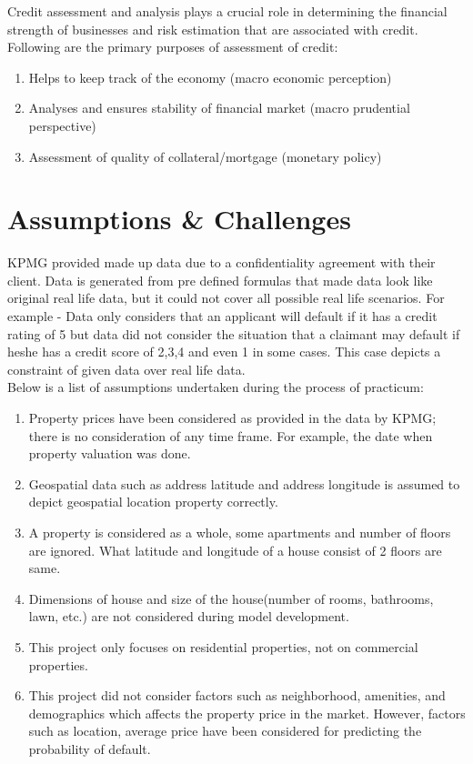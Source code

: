 Credit assessment and analysis plays a crucial role in determining the financial strength of businesses and risk estimation that are associated with credit. Following are the primary purposes of assessment of credit:
\begin{enumerate}
\item Helps to keep track of the economy (macro economic perception) 
\item Analyses and ensures stability of financial market (macro prudential perspective)
\item Assessment of quality of collateral/mortgage (monetary policy)
\end{enumerate}

\section{Assumptions \& Challenges}

KPMG provided made up data due to a confidentiality agreement with their client. Data is generated from pre defined formulas that made data look like original real life data, but it could not cover all possible real life scenarios. For example - Data only considers that an applicant will default if it has a credit rating of 5 but data did not consider the situation that a claimant may default if he\/she has a credit score of 2,3,4 and even 1 in some cases. This case depicts a constraint of given data over real life data.\\

Below is a list of assumptions undertaken during the process of practicum:
\begin{enumerate}
\item Property prices have been considered as provided in the data by KPMG; there is no consideration of any time frame. For example, the date when property valuation was done. 
\item Geospatial data such as address latitude and address longitude is assumed to depict geospatial location property correctly.
\item A property is considered as a whole, some apartments and number of floors are ignored. What latitude and longitude of a house consist of 2 floors are same.
\item Dimensions of house and size of the house(number of rooms, bathrooms, lawn, etc.) are not considered during model development.
\item This project only focuses on residential properties, not on commercial properties. 
\item This project did not consider factors such as neighborhood, amenities, and demographics which affects the property price in the market. However, factors such as location, average price have been considered for predicting the probability of default.
\end{enumerate}

